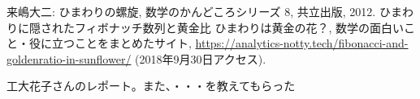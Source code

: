 \documentclass[a4j]{jarticle}
\begin{document}
\begin{thebibliography}{99}
 来嶋大二: ひまわりの螺旋, 数学のかんどころシリーズ 8, 共立出版, 2012.
 ひまわりに隠されたフィボナッチ数列と黄金比  ひまわりは黄金の花？, 数学の面白いこと・役に立つことをまとめたサイト, \url{https://analytics-notty.tech/fibonacci-and-goldenratio-in-sunflower/} (2018年9月30日アクセス).

 工大花子さんのレポート。また、・・・を教えてもらった 

\end{thebibliography}
\end{document}
